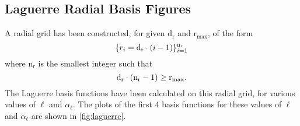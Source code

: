 \documentclass[]{article}
\begin{document}
\subsection{Laguerre Radial Basis Figures}
\label{sec:lagu-radi-basis-figs}

A radial grid has been constructed, for given $\mathrm{d_{r}}$ and
$\mathrm{r_{max}}$, of the form
\begin{equation*}
  \lbrace
    r_{i}
    =
    \mathrm{d_{r}}
    \cdot
    (i - 1)
  \rbrace_{i = 1}^{\mathrm{n_{r}}}
\end{equation*}
where $\mathrm{n_{r}}$ is the smallest integer such that
\begin{equation*}
  \mathrm{d_r}
  \cdot
  (\mathrm{n_r} - 1)
  \geq
  \mathrm{r_{max}}
  .
\end{equation*}
The Laguerre basis functions have been calculated on this radial grid,
for various values of $\ell$ and $\alpha_{\ell}$.
The plots of the first 4 basis functions for these values of $\ell$ and
$\alpha_{\ell}$ are shown in \autoref{fig:laguerre}.
\end{document}
